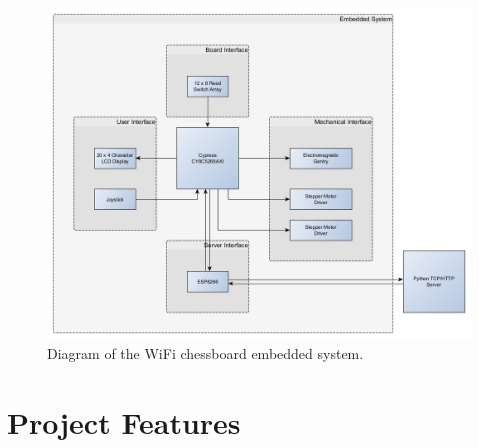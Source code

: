 \documentclass{article}
\begin{document}
\begin{figure}
    \centering
    \includegraphics[scale=0.5]{BlockDiagram}
    \caption{Diagram of the WiFi chessboard embedded system.}
\end{figure}


\section*{Project Features}
\end{document}
